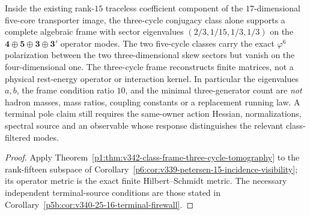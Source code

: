 \documentclass[12pt,a4paper]{article}
\begin{document}
\begin{corollary}
\label{p5b:cor:v342-class-tomography-no-mass}
Inside the existing rank-$15$ traceless coefficient component
of the $17$-dimensional five-core transporter image, the
three-cycle conjugacy class alone supports a complete algebraic
frame with sector eigenvalues $(2/3,1/15,1/3,1/3)$ on the
$\mathbf4\oplus\mathbf5\oplus\mathbf3\oplus\mathbf3'$
operator modes.  The two five-cycle classes carry the exact
$\varphi^6$ polarization between the two three-dimensional
skew sectors but vanish on the four-dimensional one.
The three-cycle frame reconstructs finite matrices, not a
physical rest-energy operator or interaction kernel.  In
particular the eigenvalues $a,b$, the frame condition ratio
$10$, and the minimal three-generator count are \emph{not}
hadron masses, mass ratios, coupling constants or a replacement
running law.  A terminal pole claim still requires the
same-owner action Hessian, normalizations, spectral source and
an observable whose response distinguishes the relevant
class-filtered modes.
\end{corollary}
\begin{proof}
Apply Theorem~\ref{p1:thm:v342-class-frame-three-cycle-tomography}
to the rank-fifteen subspace of
Corollary~\ref{p6:cor:v339-petersen-15-incidence-visibility};
its operator metric is the exact finite Hilbert--Schmidt metric.
The necessary independent terminal-source conditions are those
stated in Corollary~\ref{p5b:cor:v340-25-16-terminal-firewall}.
\end{proof}
\end{document}
